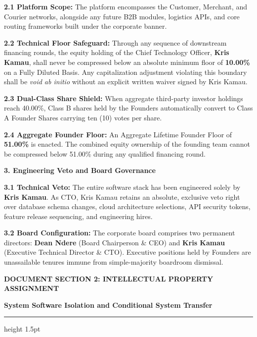\documentclass[11pt,a4paper]{article}
\begin{document}
\textbf{2.1 Platform Scope:} The platform encompasses the Customer, Merchant, and Courier networks, alongside any future B2B modules, logistics APIs, and core routing frameworks built under the corporate banner.

\textbf{2.2 Technical Floor Safeguard:} Through any sequence of downstream financing rounds, the equity holding of the Chief Technology Officer, \textbf{Kris Kamau}, shall never be compressed below an absolute minimum floor of \textbf{10.00\%} on a Fully Diluted Basis. Any capitalization adjustment violating this boundary shall be \textit{void ab initio} without an explicit written waiver signed by Kris Kamau.

\textbf{2.3 Dual-Class Share Shield:} When aggregate third-party investor holdings reach 40.00\%, Class B shares held by the Founders automatically convert to Class A Founder Shares carrying ten (10) votes per share.

\textbf{2.4 Aggregate Founder Floor:} An Aggregate Lifetime Founder Floor of \textbf{51.00\%} is enacted. The combined equity ownership of the founding team cannot be compressed below 51.00\% during any qualified financing round.

\vspace{0.2cm}
\textbf{\color{CorporateNavy} 3. Engineering Veto and Board Governance}

\textbf{3.1 Technical Veto:} The entire software stack has been engineered solely by \textbf{Kris Kamau}. As CTO, Kris Kamau retains an absolute, exclusive veto right over database schema changes, cloud architecture selections, API security tokens, feature release sequencing, and engineering hires.

\textbf{3.2 Board Configuration:} The corporate board comprises two permanent directors: \textbf{Dean Ndere} (Board Chairperson \& CEO) and \textbf{Kris Kamau} (Executive Technical Director \& CTO). Executive positions held by Founders are unassailable tenures immune from simple-majority boardroom dismissal.

\newpage

{\fontsize{18}{22}\sffamily\bfseries\color{CorporateNavy} DOCUMENT SECTION 2: INTELLECTUAL PROPERTY ASSIGNMENT}

\vspace{0.1cm}
\textsf{\small\bfseries\color{LinkBlue} System Software Isolation and Conditional System Transfer}
\vspace{0.2cm}
\color{RuleNavy}\hrule height 1.5pt
\vspace{0.4cm}
\end{document}
